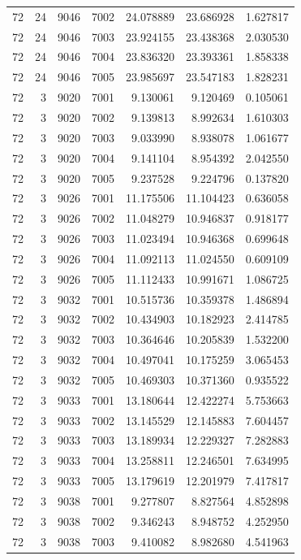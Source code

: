 \begin{table}
\begin{tabular}{rrrrrrr}
72 & 24 & 9046 & 7002 & 24.078889 & 23.686928 & 1.627817 \\
72 & 24 & 9046 & 7003 & 23.924155 & 23.438368 & 2.030530 \\
72 & 24 & 9046 & 7004 & 23.836320 & 23.393361 & 1.858338 \\
72 & 24 & 9046 & 7005 & 23.985697 & 23.547183 & 1.828231 \\
72 & 3 & 9020 & 7001 & 9.130061 & 9.120469 & 0.105061 \\
72 & 3 & 9020 & 7002 & 9.139813 & 8.992634 & 1.610303 \\
72 & 3 & 9020 & 7003 & 9.033990 & 8.938078 & 1.061677 \\
72 & 3 & 9020 & 7004 & 9.141104 & 8.954392 & 2.042550 \\
72 & 3 & 9020 & 7005 & 9.237528 & 9.224796 & 0.137820 \\
72 & 3 & 9026 & 7001 & 11.175506 & 11.104423 & 0.636058 \\
72 & 3 & 9026 & 7002 & 11.048279 & 10.946837 & 0.918177 \\
72 & 3 & 9026 & 7003 & 11.023494 & 10.946368 & 0.699648 \\
72 & 3 & 9026 & 7004 & 11.092113 & 11.024550 & 0.609109 \\
72 & 3 & 9026 & 7005 & 11.112433 & 10.991671 & 1.086725 \\
72 & 3 & 9032 & 7001 & 10.515736 & 10.359378 & 1.486894 \\
72 & 3 & 9032 & 7002 & 10.434903 & 10.182923 & 2.414785 \\
72 & 3 & 9032 & 7003 & 10.364646 & 10.205839 & 1.532200 \\
72 & 3 & 9032 & 7004 & 10.497041 & 10.175259 & 3.065453 \\
72 & 3 & 9032 & 7005 & 10.469303 & 10.371360 & 0.935522 \\
72 & 3 & 9033 & 7001 & 13.180644 & 12.422274 & 5.753663 \\
72 & 3 & 9033 & 7002 & 13.145529 & 12.145883 & 7.604457 \\
72 & 3 & 9033 & 7003 & 13.189934 & 12.229327 & 7.282883 \\
72 & 3 & 9033 & 7004 & 13.258811 & 12.246501 & 7.634995 \\
72 & 3 & 9033 & 7005 & 13.179619 & 12.201979 & 7.417817 \\
72 & 3 & 9038 & 7001 & 9.277807 & 8.827564 & 4.852898 \\
72 & 3 & 9038 & 7002 & 9.346243 & 8.948752 & 4.252950 \\
72 & 3 & 9038 & 7003 & 9.410082 & 8.982680 & 4.541963 \\

\end{tabular}
\end{table}
